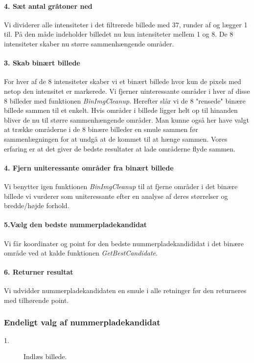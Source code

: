 \paragraph{4. Sæt antal gråtoner ned}
Vi dividerer alle intensiteter i det filtrerede billede med $37$, runder af og lægger 1 til. På den måde indeholder billedet nu kun intensiteter mellem 1 og 8. De 8 intensiteter skaber nu større sammenhængende områder.  

\paragraph{3. Skab binært billede}
For hver af de 8 intensiteter skaber vi et binært billede hvor kun de pixels med netop den intensitet er markerede. Vi fjerner uinteressante områder i hver af disse 8 billeder med funktionen \textit{BinImgCleanup}. Herefter slår vi de 8 "rensede" binære billede sammen til et enkelt. Hvis områder i billede ligger helt op til hinanden bliver de nu til større sammenhængende områder. Man kunne også her have valgt at trække områderne i de 8 binære billeder en smule sammen før sammenlægningen for at undgå at de kommet til at hænge sammen. Vores erfaring er at det giver de bedste resultater at lade områderne flyde sammen.   

\paragraph{4. Fjern uniteressante områder fra binært billede}
Vi benytter igen funktionen \textit{BinImgCleanup} til at fjerne områder i det binære billede vi vurderer som uniteressante efter en analyse af deres størrelser og bredde/højde forhold.

\paragraph{5.Vælg den bedste nummerpladekandidat}
Vi får koordinater og point for den bedste nummerpladekandididat i det binære område ved at kalde funktionen \textit{GetBestCandidate}. 

\paragraph{6. Returner resultat}
Vi udvidder nummerpladekandidaten en smule i alle retninger før den returneres med tilhørende point.


\subsubsection{Endeligt valg af nummerpladekandidat}
\begin{description}
\item[1.] Indlæs billede.
\end{description}


